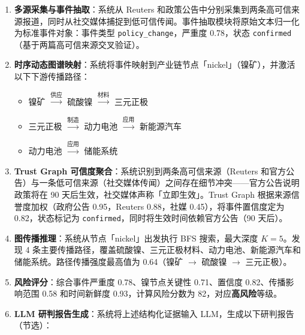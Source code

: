 \documentclass[12pt,a4paper]{article}
\newcommand{\term}[1]{\textbf{#1}}
\begin{document}
\begin{enumerate}
    \item \term{多源采集与事件抽取}：系统从 Reuters 和政策公告中分别采集到两条高可信来源报道，同时从社交媒体捕捉到低可信传闻。事件抽取模块将原始文本归一化为标准事件对象：事件类型 \texttt{policy\_change}，严重度 0.78，状态 \texttt{confirmed}（基于两篇高可信来源交叉验证）。
    \item \term{时序动态图谱映射}：系统将事件映射到产业链节点「nickel」（镍矿），并激活以下下游传播路径：
    \begin{itemize}
        \item 镍矿 $\xrightarrow{\text{供应}}$ 硫酸镍 $\xrightarrow{\text{材料}}$ 三元正极
        \item 三元正极 $\xrightarrow{\text{制造}}$ 动力电池 $\xrightarrow{\text{应用}}$ 新能源汽车
        \item 动力电池 $\xrightarrow{\text{应用}}$ 储能系统
    \end{itemize}
    \item \term{Trust Graph 可信度聚合}：系统识别到两条高可信来源（Reuters 和官方公告）与一条低可信来源（社交媒体传闻）之间存在细节冲突——官方公告说明政策将在 90 天后生效，社交媒体声称「立即生效」。Trust Graph 根据来源信誉度加权（政府公告 0.95，Reuters 0.88，社媒 0.45），将事件置信度定为 0.82，状态标记为 \texttt{confirmed}，同时将生效时间依赖官方公告（90 天后）。
    \item \term{图传播推理}：系统从节点「nickel」出发执行 BFS 搜索，最大深度 $K = 5$。发现 4 条主要传播路径，覆盖硫酸镍、三元正极材料、动力电池、新能源汽车和储能系统。路径传播强度最高值为 0.64（镍矿 $\to$ 硫酸镍 $\to$ 三元正极）。
    \item \term{风险评分}：综合事件严重度 0.78、镍节点关键性 0.71、置信度 0.82、传播影响范围 0.58 和时间新鲜度 0.93，计算风险分数为 82，对应\textbf{高风险}等级。
    \item \term{LLM 研判报告生成}：系统将上述结构化证据输入 LLM，生成以下研判报告（节选）：
\end{enumerate}
\end{document}
